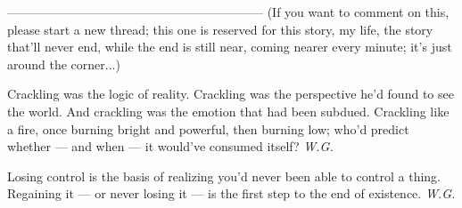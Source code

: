 --------------------------------------------------------------
(If you want to comment on this, please start a new thread; this one is reserved for this story, my life, the story that'll never end, while the end is still near, coming nearer every minute; it's just around the corner...)

Crackling 
was the logic 
of reality. 
Crackling 
was the perspective 
he'd found 
to see the world. 
And crackling 
was the emotion 
that had been subdued. 
Crackling like a fire, 
once burning bright and powerful, 
then burning low; 
who'd predict 
whether --- and when --- 
it would've consumed 
itself? 
\emph{W.G.}

Losing control 
is the basis of realizing 
you'd never been able to control a thing. 
Regaining it --- 
or never losing it --- 
is the first step 
to the end of existence. 
\emph{W.G.}
